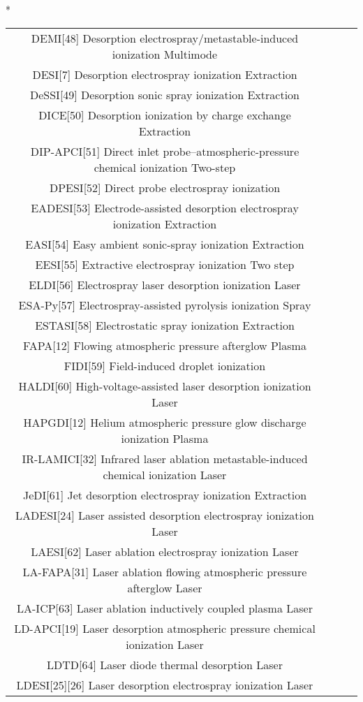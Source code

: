 \begin{table}{*}
\begin{tabular}{|c|c|c|l|}
DEMI[48] Desorption electrospray/metastable-induced ionization Multimode \\
DESI[7] Desorption electrospray ionization Extraction \\
DeSSI[49] Desorption sonic spray ionization Extraction \\
DICE[50] Desorption ionization by charge exchange Extraction \\
DIP-APCI[51] Direct inlet probe–atmospheric-pressure chemical ionization Two-step \\
DPESI[52] Direct probe electrospray ionization  \\
EADESI[53] Electrode-assisted desorption electrospray ionization Extraction \\
EASI[54] Easy ambient sonic-spray ionization Extraction \\
EESI[55] Extractive electrospray ionization Two step \\
ELDI[56] Electrospray laser desorption ionization Laser \\
ESA-Py[57] Electrospray-assisted pyrolysis ionization Spray \\
ESTASI[58] Electrostatic spray ionization Extraction \\
FAPA[12] Flowing atmospheric pressure afterglow Plasma \\
FIDI[59] Field-induced droplet ionization  \\
HALDI[60] High-voltage-assisted laser desorption ionization Laser \\
HAPGDI[12] Helium atmospheric pressure glow discharge ionization Plasma \\
IR-LAMICI[32] Infrared laser ablation metastable-induced chemical ionization Laser \\
JeDI[61] Jet desorption electrospray ionization Extraction \\
LADESI[24] Laser assisted desorption electrospray ionization Laser \\
LAESI[62] Laser ablation electrospray ionization Laser \\
LA-FAPA[31] Laser ablation flowing atmospheric pressure afterglow Laser \\
LA-ICP[63] Laser ablation inductively coupled plasma Laser \\
LD-APCI[19] Laser desorption atmospheric pressure chemical ionization Laser \\
LDTD[64] Laser diode thermal desorption Laser \\
LDESI[25][26] Laser desorption electrospray ionization Laser \\

\end{tabular}
\end{table}
